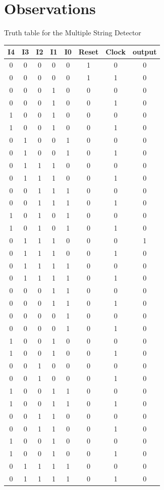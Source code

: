 \documentclass[12pt]{article}
\begin{document}
	\pagebreak
	\section{Observations}

	
	Truth table for the Multiple String Detector
		

		
		\begin{longtable}{|c|c|c|c|c|c|c|c|} 
		
		\hline  
		
		I4 & I3 & I2 & I1 & I0 & Reset & Clock & output\\  
		
		\hline  %
		0&0&0&0&0&1&0&0\\
		0&0&0&0&0&1&1&0\\
		0&0&0&1&0&0&0&0\\
		0&0&0&1&0&0&1&0\\
		1&0&0&1&0&0&0&0\\
		1&0&0&1&0&0&1&0\\
		0&1&0&0&1&0&0&0\\
		0&1&0&0&1&0&1&0\\
		0&1&1&1&0&0&0&0\\
		0&1&1&1&0&0&1&0\\
		0&0&1&1&1&0&0&0\\
		0&0&1&1&1&0&1&0\\
		1&0&1&0&1&0&0&0\\
		1&0&1&0&1&0&1&0\\
		0&1&1&1&0&0&0&1\\
		0&1&1&1&0&0&1&0\\
		0&1&1&1&1&0&0&0\\
		0&1&1&1&1&0&1&0\\
		0&0&0&1&1&0&0&0\\
		0&0&0&1&1&0&1&0\\
		0&0&0&0&1&0&0&0\\
		0&0&0&0&1&0&1&0\\
		1&0&0&1&0&0&0&0\\
		1&0&0&1&0&0&1&0\\
		0&0&1&0&0&0&0&0\\
		0&0&1&0&0&0&1&0\\
		1&0&0&1&1&0&0&0\\
		1&0&0&1&1&0&1&0\\
		0&0&1&1&0&0&0&0\\
		0&0&1&1&0&0&1&0\\
		1&0&0&1&0&0&0&0\\
		1&0&0&1&0&0&1&0\\
		0&1&1&1&1&0&0&0\\
		\hline
		0&1&1&1&1&0&1&0\\
		

\end{longtable}
\end{document}
